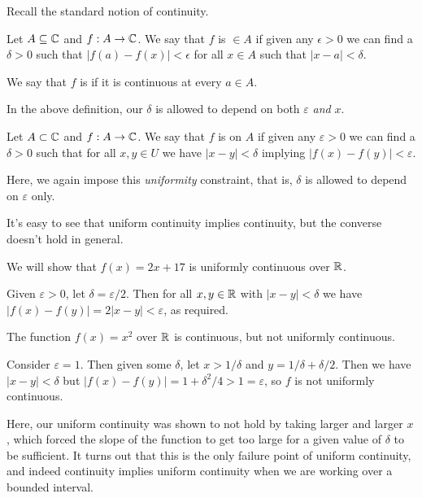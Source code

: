 \documentclass[a4paper]{scrartcl}
\begin{document}
Recall the standard notion of continuity.

\begin{definition}[Continuity]
	Let $A \subseteq \mathbb{C}$ and $f: A \rightarrow \mathbb{C}$. We say that $f$ is  $\in A$ if given any $\epsilon > 0$ we can find a $\delta > 0$ such that $|f(a) - f(x)| < \epsilon$ for all $x \in A$ such that $|x -a | < \delta$.


	We say that $f$ is  if it is continuous at every $a \in A$.
\end{definition}

In the above definition, our $\delta$ is allowed to depend on both $\varepsilon$ \emph{and} $x$.

\begin{definition}
    Let $A \subset \mathbb{C}$ and $f: A \rightarrow \mathbb{C}$. We say that $f$ is  on $A$ if given any $\varepsilon > 0$ we can find a $\delta > 0$ such that for all $x, y \in U$ we have $|x - y| < \delta$ implying $|f(x) - f(y)| < \varepsilon$.
\end{definition}

Here, we again impose this \emph{uniformity} constraint, that is, $\delta$ is allowed to depend on $\varepsilon$ only. 

It's easy to see that uniform continuity implies continuity, but the converse doesn't hold in general.

\begin{example}
    We will show that $f(x) = 2x + 17$ is uniformly continuous over $\mathbb{R}$. 

    Given $\varepsilon > 0$, let $\delta = \varepsilon / 2$. Then for all $x, y \in \mathbb{R}$ with $|x - y| < \delta$ we have $|f(x) - f(y)| = 2|x - y| < \varepsilon$, as required.
\end{example}

\begin{example}
    The function $f(x) = x^2$ over $\mathbb{R}$ is continuous, but not uniformly continuous. 

    Consider $\varepsilon = 1$. Then given some $\delta$, let $x > 1/\delta$ and $y = 1/\delta + \delta/2$. Then we have $|x - y| < \delta$ but $|f(x) - f(y)| = 1 + \delta^2/4 > 1 = \varepsilon$, so $f$ is not uniformly continuous.
\end{example}

Here, our uniform continuity was shown to not hold by taking larger and larger $x$, which forced the slope of the function to get too large for a given value of $\delta$ to be sufficient. It turns out that this is the only failure point of uniform continuity, and indeed continuity implies uniform continuity when we are working over a bounded interval.
\end{document}
